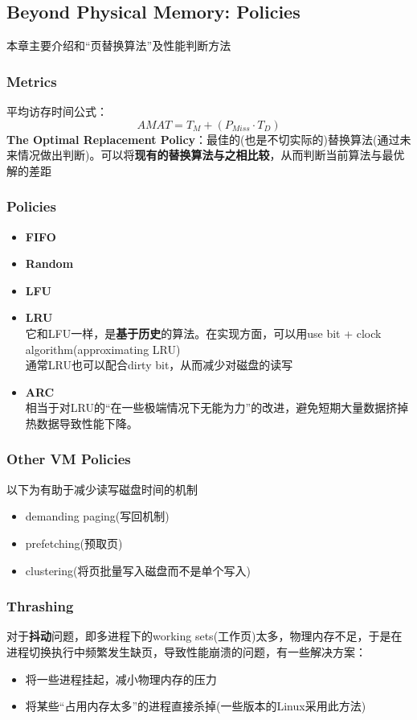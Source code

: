 \documentclass{article}
\begin{document}
\subsection{Beyond Physical Memory: Policies}
本章主要介绍和“页替换算法”及性能判断方法
\subsubsection{Metrics}
平均访存时间公式：
$$
AMAT = T_M + (P_{Miss} \cdot T_D)
$$
\textbf{The Optimal Replacement Policy}：最佳的(也是不切实际的)替换算法(通过未来情况做出判断)。可以将\textbf{现有的替换算法与之相比较}，从而判断当前算法与最优解的差距
\
\subsubsection{Policies}
\begin{itemize}
    \item \textbf{FIFO}
    \item \textbf{Random}
    \item \textbf{LFU}
    \item \textbf{LRU} \\
    它和LFU一样，是\textbf{基于历史}的算法。在实现方面，可以用use bit + clock algorithm(approximating LRU) \\
    \indent 通常LRU也可以配合dirty bit，从而减少对磁盘的读写
    \item \textbf{ARC} \\
    相当于对LRU的“在一些极端情况下无能为力”的改进，避免短期大量数据挤掉热数据导致性能下降。
\end{itemize}
\subsubsection{Other VM Policies}
以下为有助于减少读写磁盘时间的机制
\begin{itemize}
    \item demanding paging(写回机制)
    \item prefetching(预取页)
    \item clustering(将页批量写入磁盘而不是单个写入)
\end{itemize}
\subsubsection{Thrashing}
对于\textbf{抖动}问题，即多进程下的working sets(工作页)太多，物理内存不足，于是在进程切换执行中频繁发生缺页，导致性能崩溃的问题，有一些解决方案：
\begin{itemize}
    \item 将一些进程挂起，减小物理内存的压力
    \item 将某些“占用内存太多”的进程直接杀掉(一些版本的Linux采用此方法)
\end{itemize}
\end{document}
